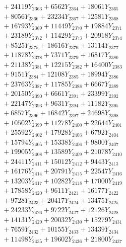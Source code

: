 \documentclass[a4paper,10pt]{article}
\begin{document}
{\begin{align}
&\;  + 24119 Y_{2363} + 6562 Y_{2364} + 18061 Y_{2365} \\[0.3ex]
&\;  + 8056 Y_{2366} + 23234 Y_{2367} + 12581 Y_{2368} \\[0.5ex]\allowbreak
&\;  + 16793 Y_{2369} + 11449 Y_{2370} + 19884 Y_{2371} \\[0.3ex]
&\;  + 23189 Y_{2372} + 11429 Y_{2373} + 20918 Y_{2374} \\[0.3ex]
&\;  + 8525 Y_{2375} + 18616 Y_{2376} + 13114 Y_{2377} \\[0.3ex]
&\;  + 11878 Y_{2378} + 7371 Y_{2379} + 16817 Y_{2380} \\[0.3ex]
&\;  + 21138 Y_{2381} + 12215 Y_{2382} + 16400 Y_{2383} \\[0.3ex]
&\;  + 9151 Y_{2384} + 12108 Y_{2385} + 18994 Y_{2386} \\[0.3ex]
&\;  + 23763 Y_{2387} + 11785 Y_{2388} + 6667 Y_{2389} \\[0.3ex]
&\;  + 20150 Y_{2390} + 6661 Y_{2391} + 23399 Y_{2392} \\[0.3ex]
&\;  + 22147 Y_{2393} + 9631 Y_{2394} + 11182 Y_{2395} \\[0.3ex]
&\;  + 6857 Y_{2396} + 16842 Y_{2397} + 24698 Y_{2398} \\[0.5ex]\allowbreak
&\;  + 10502 Y_{2399} + 11278 Y_{2400} + 22644 Y_{2401} \\[0.3ex]
&\;  + 25592 Y_{2402} + 17928 Y_{2403} + 6792 Y_{2404} \\[0.3ex]
&\;  + 15794 Y_{2405} + 15338 Y_{2406} + 9800 Y_{2407} \\[0.3ex]
&\;  + 19905 Y_{2408} + 13589 Y_{2409} + 21078 Y_{2410} \\[0.3ex]
&\;  + 24411 Y_{2411} + 15012 Y_{2412} + 9443 Y_{2413} \\[0.3ex]
&\;  + 16176 Y_{2414} + 20791 Y_{2415} + 22547 Y_{2416} \\[0.3ex]
&\;  + 13203 Y_{2417} + 10282 Y_{2418} + 17000 Y_{2419} \\[0.3ex]
&\;  + 17858 Y_{2420} + 9611 Y_{2421} + 16177 Y_{2422} \\[0.3ex]
&\;  + 9728 Y_{2423} + 20417 Y_{2424} + 13475 Y_{2425} \\[0.3ex]
&\;  + 24233 Y_{2426} + 9722 Y_{2427} + 12126 Y_{2428} \\[0.5ex]\allowbreak
&\;  + 14131 Y_{2429} + 20032 Y_{2430} + 15279 Y_{2431} \\[0.3ex]
&\;  + 7659 Y_{2432} + 10155 Y_{2433} + 13439 Y_{2434} \\[0.3ex]
&\;  + 11498 Y_{2435} + 19602 Y_{2436} + 21800 Y_{2437} \\[0.3ex]

\end{align}}
\end{document}
